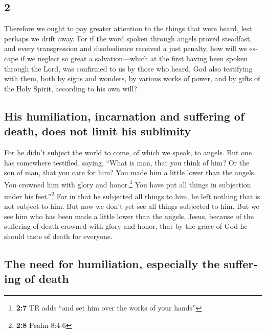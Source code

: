 \begin{paracol}{2}
\begin{otherlanguage}{english}
\hypertarget{section-3}{%
\section{2}\label{section-3}}

 Therefore we ought to pay greater attention to the things
that were heard, lest perhaps we drift away.  For if the
word spoken through angels proved steadfast, and every transgression and
disobedience received a just penalty,  how will we escape
if we neglect so great a salvation---which at the first having been
spoken through the Lord, was confirmed to us by those who heard,
 God also testifying with them, both by signs and wonders,
by various works of power, and by gifts of the Holy Spirit, according to
his own will?

\hypertarget{his-humiliation-incarnation-and-suffering-of-death-does-not-limit-his-sublimity}{%
\subsection{His humiliation, incarnation and suffering of death, does
not limit his
sublimity}\label{his-humiliation-incarnation-and-suffering-of-death-does-not-limit-his-sublimity}}

 For he didn't subject the world to come, of which we
speak, to angels.  But one has somewhere testified,
saying, ``What is man, that you think of him? Or the son of man, that
you care for him?  You made him a little lower than the
angels. You crowned him with glory and honor.\footnote{\textbf{2:7} TR
  adds ``and set him over the works of your hands''}  You
have put all things in subjection under his feet.''\footnote{\textbf{2:8}
  Psalm 8:4-6} For in that he subjected all things to him, he left
nothing that is not subject to him. But now we don't yet see all things
subjected to him.  But we see him who has been made a
little lower than the angels, Jesus, because of the suffering of death
crowned with glory and honor, that by the grace of God he should taste
of death for everyone.

\hypertarget{the-need-for-humiliation-especially-the-suffering-of-death}{%
\subsection{The need for humiliation, especially the suffering of
death}\label{the-need-for-humiliation-especially-the-suffering-of-death}}


\end{otherlanguage}
\end{paracol}
